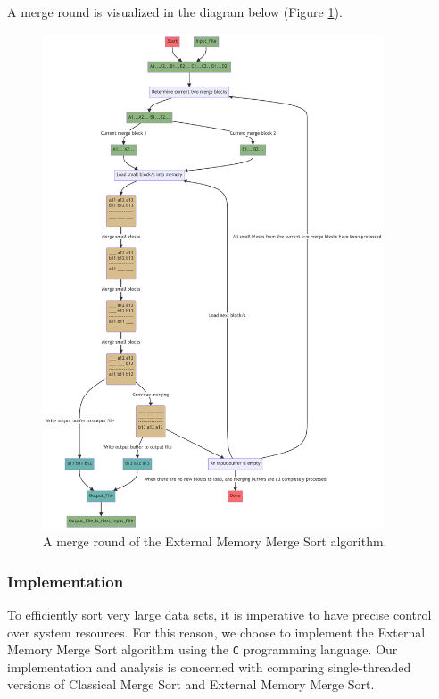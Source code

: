 \documentclass[twocolumn]{article}
\begin{document}
A merge round is visualized in the diagram below (Figure \ref{fig:merge_round_diagram.pdf}).
\begin{figure}
	\centering
	\includegraphics[width=0.9\textwidth]{./res/merge_round_diagram.pdf}
	\caption{A merge round of the External Memory Merge Sort algorithm.}
	\label{fig:merge_round_diagram.pdf}
\end{figure}

\subsubsection*{Implementation}
To efficiently sort very large data sets, it is imperative to have precise control over system resources.
For this reason, we choose to implement the External Memory Merge Sort algorithm using the \texttt{C} programming language.
Our implementation and analysis is concerned with comparing single-threaded versions of Classical Merge Sort and External Memory Merge Sort. 
\end{document}
